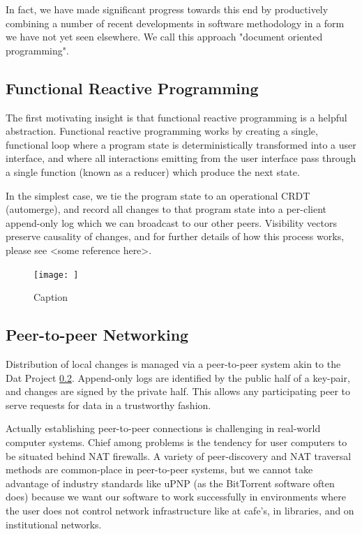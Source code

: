 \documentclass[sigplan,10pt]{acmart}
\begin{document}
In fact, we have made significant progress towards this end by productively combining a number of recent developments in software methodology in a form we have not yet seen elsewhere. We call this approach "document oriented programming".

\subsection{Functional Reactive Programming}
The first motivating insight is that functional reactive programming is a helpful abstraction. Functional reactive programming works by creating a single, functional loop where a program state is deterministically transformed into a user interface, and where all interactions emitting from the user interface pass through a single function (known as a reducer) which produce the next state.

In the simplest case, we tie the program state to an operational CRDT (automerge), and record all changes to that program state into a per-client append-only log which we can broadcast to our other peers. Visibility vectors preserve causality of changes, and for further details of how this process works, please see <some reference here>.

\begin{figure}
    \centering
    \texttt{[image: ]}
    \caption{Caption}
    \label{fig:my_label}
\end{figure}

\subsection{Peer-to-peer Networking}

Distribution of local changes is managed via a peer-to-peer system akin to the Dat Project \ref{}. Append-only logs are identified by the public half of a key-pair, and changes are signed by the private half. This allows any participating peer to serve requests for data in a trustworthy fashion.  

Actually establishing peer-to-peer connections is challenging in real-world computer systems. Chief among problems is the tendency for user computers to be situated behind NAT firewalls. A variety of peer-discovery and NAT traversal methods are common-place in peer-to-peer systems, but we cannot take advantage of industry standards like uPNP (as the BitTorrent software often does) because we want our software to work successfully in environments where the user does not control network infrastructure like at cafe's, in libraries, and on institutional networks.
\end{document}
